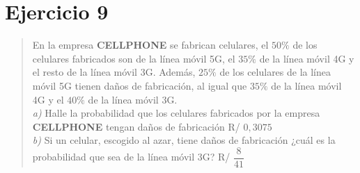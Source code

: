 \documentclass[11pt]{article}
\begin{document}
\newpage
\section*{Ejercicio 9}

\begin{quote}
En la empresa \textbf{CELLPHONE} se fabrican celulares, el $50\%$ de los celulares fabricados son de la línea móvil 5G, el $35\%$ de la línea móvil 4G y el resto de la línea móvil 3G. Además, $25\%$ de los celulares de la línea móvil 5G tienen daños de fabricación, al igual que $35\%$ de la línea móvil 4G y el $40\%$ de la línea móvil 3G.\\
\emph{a)} Halle la probabilidad que los celulares fabricados por la empresa \textbf{CELLPHONE} tengan daños de fabricación \hfill R/ $0,3075$\\
\emph{b)} Si un celular, escogido al azar, tiene daños de fabricación ¿cuál es la probabilidad que sea de la línea móvil 3G? \hfill R/ $\dfrac{8}{41}$
\end{quote}
\end{document}
